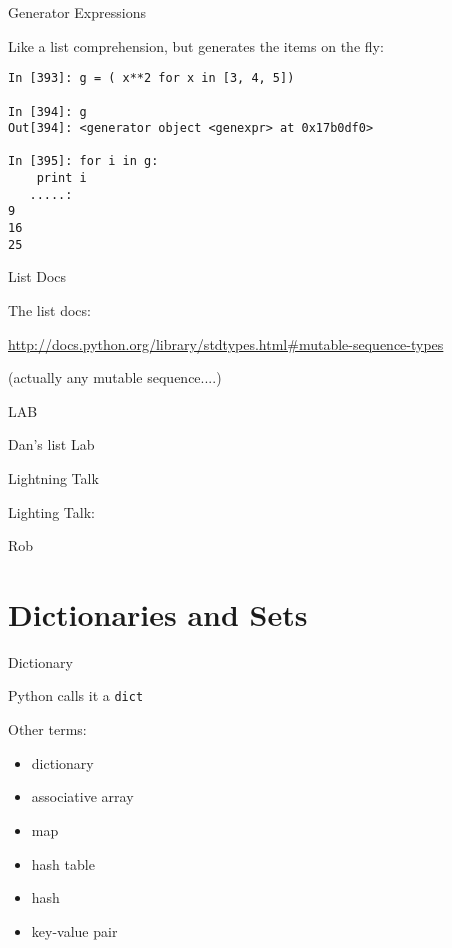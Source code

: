 \documentclass{beamer}
\begin{document}
\begin{frame}[fragile]{Generator Expressions}

{\Large Like a list comprehension, but generates the items on the fly:}

\begin{verbatim}
In [393]: g = ( x**2 for x in [3, 4, 5])

In [394]: g
Out[394]: <generator object <genexpr> at 0x17b0df0>

In [395]: for i in g:
    print i
   .....:     
9
16
25
\end{verbatim}

\end{frame} 



\begin{frame}[fragile]{List Docs}

\vfill
{\Large The list docs:}

\vfill
\url{http://docs.python.org/library/stdtypes.html#mutable-sequence-types}

\vfill
(actually any mutable sequence....)

\end{frame} 



\begin{frame}{LAB}

\vfill
{\LARGE Dan's list Lab}
\vfill

\end{frame}

\begin{frame}{Lightning Talk}

{\center

\LARGE Lighting Talk:

\vfill
Rob
\vfill

}

\end{frame} 
%

\section{Dictionaries and Sets}

\begin{frame}[fragile]{Dictionary}

{\Large Python calls it a \verb|dict| }

\vfill
{\Large Other terms:}
\begin{itemize}
  \item dictionary
  \item associative array
  \item map
  \item hash table
  \item hash
  \item key-value pair
\end{itemize}

\vfill

\end{frame} 
\end{document}
